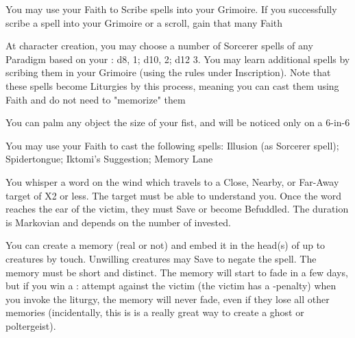 {\GOD[
Name=Hecate,
Link=small-god-hecate,
GodOf=Archfiend of Wizardry,
Holy=your Grimoire
]


You may use your Faith to Scribe spells into your Grimoire. If you successfully scribe a spell into your Grimoire or a scroll, gain that many Faith


At character creation, you may choose a number of Sorcerer spells of any Paradigm based on your \INT:  d8, 1; d10, 2; d12 3.  You may learn additional spells by scribing them in your Grimoire (using the rules under Inscription).  Note that these spells become Liturgies by this process, meaning you can cast them using Faith and do not need to "memorize" them




\GOD[
Name=Iktomi,
Link=small-god-iktomi,
GodOf=God of Tricksters,
Holy=a small puppet worn from the belt or neck
]


You can palm any object the size of your fist, and will be noticed only on a 6-in-6


You may use your Faith to cast the following spells: Illusion (as Sorcerer spell); Spidertongue; Iktomi's Suggestion; Memory Lane

\LITURGY [
  Name= Iktomi's Suggestion,
  Link= iktomi-liturgy-iktomis-suggestion,
  Paradigm= Mind ,
  Save=  Y (negates) ,
  Duration= Markovian ,
  Counter=  n/a  ,
  Keywords= None ,
  Target=   Close; Nearby; or Far-Away creature
]



You whisper a word on the wind which travels to a Close, Nearby, or Far-Away target of \DICE X2 \HD or less. The target must be able to understand you.  Once the word reaches the ear of the victim, they must Save or become Befuddled.  The duration is Markovian and depends on the number of \DICE invested.
\LITURGY [
  Name= Memory Lane,
  Link=iktomi-liturgy-memory-lane,
  Paradigm= Mind ,
  Save=  Y (negates) ,
  Duration= Varies ,
  Counter=  n/a  ,
  Keywords= Splittable ,
  Target=   Close creature(s)
]



You can create a memory (real or not) and embed it in the head(s) of up to \DICE creatures by touch.  Unwilling creatures may Save to negate the spell.  The memory must be short and distinct.  The memory will start to fade in a few days, but if you win a \RB : \FOC attempt against the victim (the victim has a -\DICE penalty) when you invoke the liturgy, the memory will never fade, even if they lose all other memories (incidentally, this is is a really great way to create a ghost or poltergeist).

}
